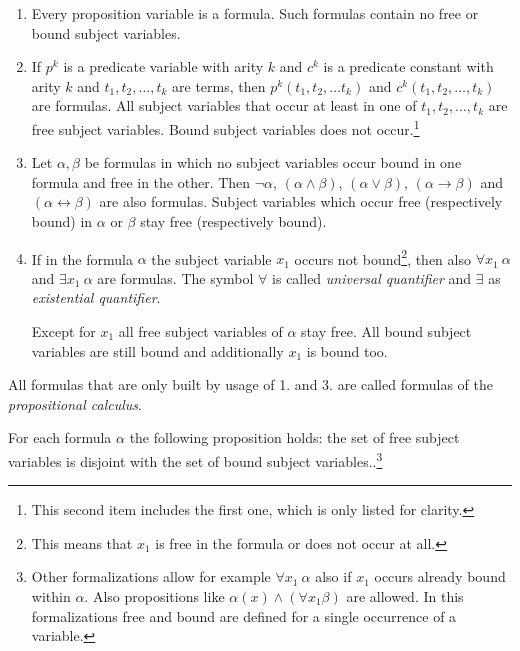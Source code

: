 \documentclass[a4paper,german,10pt,twoside]{book}
\theoremstyle{definition}
\theoremstyle{remark}
\begin{document}
\begin{enumerate}

\item Every proposition variable is a formula. Such formulas contain no free or bound subject variables.

\item If $p^k$ is a predicate variable with arity $k$ and $c^k$ is a 
predicate constant with arity $k$ and $t_1, t_2, \ldots, t_k$ are terms, 
then $p^k(t_1, t_2, \ldots t_k)$ and 
$c^k(t_1, t_2, \ldots, t_k)$ are formulas.
All subject variables that occur at least in one of $t_1, t_2, \ldots, t_k$ are free subject variables. Bound subject variables does not occur.\footnote{This second item includes the first one, which is only listed for clarity.} 

\item Let $\alpha, \beta$ be formulas in which no subject variables occur bound in one formula and free in the other. Then $\neg \alpha$, $(\alpha \land \beta)$, 
$(\alpha \lor \beta)$, $(\alpha \rightarrow \beta)$ and
$(\alpha \leftrightarrow \beta)$ are also formulas. Subject variables which occur free (respectively bound) in $\alpha$ or $\beta$ stay free (respectively bound).

\item If in the formula $\alpha$ the subject variable $x_1$ occurs not bound\footnote{This means that $x_1$ is free in the formula or does not occur at all.}, 
then also $\forall x_1~\alpha$ and $\exists x_1~\alpha$ are 
formulas. The symbol $\forall$ is called
\emph{universal quantifier} and $\exists$ 
as
\emph{existential quantifier}.

Except for $x_1$ all free subject variables of $\alpha$ stay free. All bound subject variables are still bound and additionally $x_1$ is bound too.

\end{enumerate}

All formulas that are only built by usage of 1. and 3. are called formulas of the \emph{propositional calculus}.

\par
For each formula $\alpha$ the following proposition holds: the set of free subject variables is disjoint with the set of bound subject variables..\footnote{
Other formalizations allow for example $\forall x_1~\alpha$ also if
$x_1$ occurs already bound within $\alpha$. Also propositions like
$\alpha(x) \land (\forall x_1 \beta)$ are allowed. In this formalizations
free and bound are defined for a single occurrence of a variable.}
\end{document}
